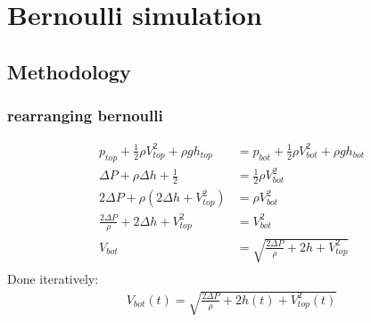 \chapter{Bernoulli simulation}
\section{Methodology}
\subsection{rearranging bernoulli}
\begin{equation}
\label{eqn:bernoulli}
\begin{split}
  p_{top} + \frac{1}{2} \rho V_{top}^{2} + \rho g h_{top} & =  p_{bot} + \frac{1}{2} \rho V_{bot}^{2} + \rho g h_{bot}  \\
  \Delta{P} + \rho \Delta{h} + \frac{1}{2} & = \frac{1}{2} \rho V_{bot}^{2} \\
  2 \Delta{P} + \rho (2 \Delta{h} + V_{top}^{2}) & = \rho V^2_{bot} \\
  \frac{2 \Delta{P}}{\rho} + 2 \Delta{h} + V_{top}^{2} &= V_{bot}^{2} \\
  V_{bot} &= \sqrt{\frac{2 \Delta{P}}{\rho} + 2h + V_{top}^{2}} \\
\end{split}
\end{equation}
Done iteratively:
\begin{equation}
\label{eqn:vtop_iterative}
\begin{split}
  V_{bot}(t) = \sqrt{\frac{2 \Delta{P}}{\rho} + 2h(t) + V_{top}^{2}(t)}
\end{split}
\end{equation}

